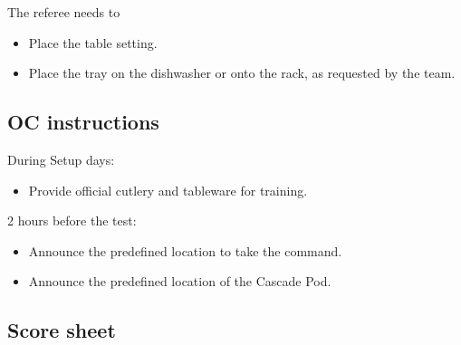 The referee needs to
\begin{itemize}
	\item Place the table setting.
	\item Place the tray on the dishwasher or onto the rack, as requested by the team.
\end{itemize}

\subsection*{OC instructions}
During Setup days:
\begin{itemize}
	\item Provide official cutlery and tableware for training.
\end{itemize}

2 hours before the test:
\begin{itemize}
	\item Announce the predefined location to take the command.
	\item Announce the predefined location of the Cascade Pod.
\end{itemize}

\subsection*{Score sheet}



